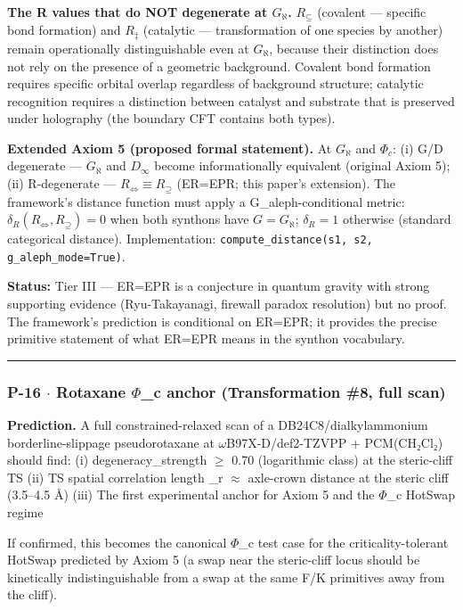 \documentclass[12pt,a4paper]{article}
\begin{document}
\textbf{The R values that do NOT degenerate at $G_{\aleph}$.} $R_{\subseteq}$ (covalent --- specific bond formation) and $R_{\ddagger}$ (catalytic --- transformation of one species by another) remain operationally distinguishable even at $G_{\aleph}$, because their distinction does not rely on the presence of a geometric background. Covalent bond formation requires specific orbital overlap regardless of background structure; catalytic recognition requires a distinction between catalyst and substrate that is preserved under holography (the boundary CFT contains both types).

\textbf{Extended Axiom 5 (proposed formal statement).} At $G_{\aleph}$ and $\Phi_c$: (i) G/D degenerate --- $G_{\aleph}$ and $D_{\infty}$ become informationally equivalent (original Axiom 5); (ii) R-degenerate --- $R_{\Leftrightarrow} \equiv R_{\supseteq}$ (ER=EPR; this paper's extension). The framework's distance function must apply a G\_aleph-conditional metric: $\delta_R(R_{\Leftrightarrow}, R_{\supseteq}) = 0$ when both synthons have $G = G_{\aleph}$; $\delta_R = 1$ otherwise (standard categorical distance). Implementation: \texttt{compute\_distance(s1, s2, g\_aleph\_mode=True)}.

\textbf{Status:} Tier III --- ER=EPR is a conjecture in quantum gravity with strong supporting evidence (Ryu-Takayanagi, firewall paradox resolution) but no proof. The framework's prediction is conditional on ER=EPR; it provides the precise primitive statement of what ER=EPR means in the synthon vocabulary.

\begin{center}
\rule{0.5\textwidth}{0.4pt}
\end{center}

\subsubsection{P-16 $\cdot$ Rotaxane $\Phi$\_c anchor (Transformation \#8, full scan)}

\textbf{Prediction.} A full constrained-relaxed scan of a DB24C8/dialkylammonium borderline-slippage pseudorotaxane at $\omega$B97X-D/def2-TZVPP + PCM(CH₂Cl₂) should find:
(i) degeneracy\_strength $\geq$ 0.70 (logarithmic class) at the steric-cliff TS
(ii) TS spatial correlation length \xi\_r $\approx$ axle-crown distance at the steric cliff (3.5--4.5 Å)
(iii) The first experimental anchor for Axiom 5 and the $\Phi$\_c HotSwap regime

If confirmed, this becomes the canonical $\Phi$\_c test case for the criticality-tolerant HotSwap predicted by Axiom 5 (a swap near the steric-cliff locus should be kinetically indistinguishable from a swap at the same F/K primitives away from the cliff).
\end{document}
